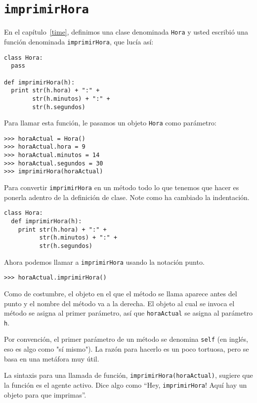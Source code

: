 \section{\texttt{imprimirHora}}
\label{printTime}

En el capítulo~\ref{time}, definimos una clase denominada
\texttt{Hora} y usted escribió una función denominada \texttt{imprimirHora}, que lucía así:

\beforeverb
\begin{verbatim}
class Hora:
  pass

def imprimirHora(h):
  print str(h.hora) + ":" + 
        str(h.minutos) + ":" + 
        str(h.segundos)
\end{verbatim}
\afterverb
%
Para llamar esta función, le pasamos un objeto \texttt{Hora}
como parámetro:

\beforeverb
\begin{verbatim}
>>> horaActual = Hora()
>>> horaActual.hora = 9
>>> horaActual.minutos = 14
>>> horaActual.segundos = 30
>>> imprimirHora(horaActual)
\end{verbatim}
\afterverb
%
Para convertir \texttt{imprimirHora} en un método todo lo 
que tenemos que hacer es ponerla adentro de la definición
de clase. Note como ha cambiado la indentación.

\beforeverb
\begin{verbatim}
class Hora:
  def imprimirHora(h):
    print str(h.hora) + ":" + 
          str(h.minutos) + ":" + 
          str(h.segundos)

\end{verbatim}
\afterverb
%
Ahora podemos llamar a  \texttt{imprimirHora} usando la
notación punto.


\beforeverb
\begin{verbatim}
>>> horaActual.imprimirHora()
\end{verbatim}
\afterverb
%
Como de costumbre, el objeto en el que el método se llama
aparece antes del punto y el nombre del método va a la 
derecha. El objeto al cual se invoca el método se asigna al primer
parámetro, así que  \texttt{horaActual} se asigna al 
parámetro \texttt{h}.

Por convención, el primer parámetro de un método se
denomina  \texttt{self} (en inglés, eso es algo como "sí mismo").  
La razón para hacerlo es un poco tortuosa,
pero se basa en una metáfora muy útil.

La sintaxis para una llamada de función, \texttt{imprimirHora(horaActual)}, 
sugiere que la función es el agente activo. Dice algo como ``Hey, \texttt{imprimirHora}! Aquí hay un objeto para que imprimas''.


